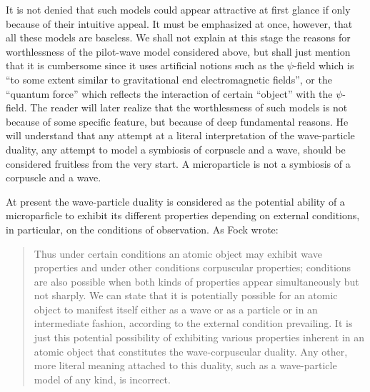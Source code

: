 \documentclass[a4paper,sfsidenotes,colorlinks=true]{tufte-book}
\numberwithin{equation}{section}
\numberwithin{figure}{section}
\begin{document}
It is not denied that such models could appear attractive at first
glance if only because of their intuitive appeal. It must be
emphasized at once, however, that all these models are baseless. We
shall not explain at this stage the reasons for worthlessness of the
pilot-wave model considered above, but shall just mention that it is
cumbersome since it uses artificial notions such as the $\psi$-field which
is ``to some extent similar to gravitational end electromagnetic
fields'', or the ``quantum force'' which reflects the interaction of
certain ``object'' with the $\psi$-field. The reader will later realize that
the worthlessness of such models is not because of some specific
feature, but because of deep fundamental reasons. He will understand
that any attempt at a literal interpretation of the wave-particle
duality, any attempt to model a symbiosis of corpuscle and a wave,
should be considered fruitless from the very start. A microparticle
is not a symbiosis of a corpuscle and a wave.

At present the
wave-particle duality is considered as the potential ability of a
microparficle to exhibit its different properties depending on
external conditions, in particular, on the conditions of
observation. As Fock wrote: 
\begin{quote}
  Thus under certain conditions an atomic object may exhibit wave
  properties and under other conditions corpuscular properties;
  conditions are also possible when both kinds of properties appear
  simultaneously but not sharply. We can state that it is potentially
  possible for an atomic object to manifest itself either as a wave or
  as a particle or in an intermediate fashion, according to the
  external condition prevailing. It is just this potential possibility
  of exhibiting various properties inherent in an atomic object that
  constitutes the wave-corpuscular duality. Any other, more literal
  meaning attached to this duality, such as a wave-particle model of
  any kind, is incorrect.\cite{fock-1957}  
\end{quote}
\end{document}

